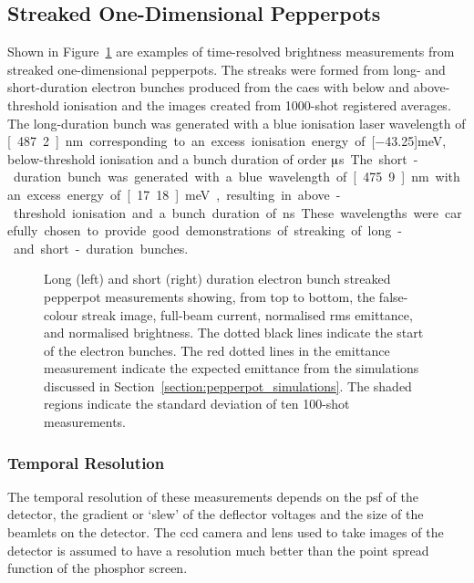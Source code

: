 \subsection{Streaked One-Dimensional Pepperpots}\label{section:streaked_pepperpot_results}
Shown in Figure~\ref{figure:streaks} are examples of time-resolved brightness measurements from streaked one-dimensional pepperpots.
The streaks were formed from long- and short-duration electron bunches produced from the \gls{caes} with below and above-threshold ionisation and the images created from 1000-shot registered averages.
The long-duration bunch was generated with a blue ionisation laser wavelength of \unit[487.2]{nm} corresponding to an excess ionisation energy of \unit[$-$43.25]{meV}, below-threshold ionisation and a bunch duration of order \unit[10]{$\muup$s}.
The short-duration bunch was generated with a blue wavelength of \unit[475.9]{nm} with an excess energy of \unit[17.18]{meV}, resulting in above-threshold ionisation and a bunch duration of \unit[5]{ns}.
These wavelengths were carefully chosen to provide good demonstrations of streaking of long- and short-duration bunches.

\begin{figure}
    \center
    
    \caption[Streaked brightness measurements for $\muup$ and ns timescales.]{Long (left) and short (right) duration electron bunch streaked pepperpot measurements showing, from top to bottom, the false-colour streak image, full-beam current, normalised \gls{rms} emittance, and normalised brightness. The dotted black lines indicate the start of the electron bunches. The red dotted lines in the emittance measurement indicate the expected emittance from the simulations discussed in Section~\ref{section:pepperpot_simulations}. The shaded regions indicate the standard deviation of ten 100-shot measurements.}
    \label{figure:streaks}
\end{figure}

\subsubsection{Temporal Resolution}
The temporal resolution of these measurements depends on the \gls{psf} of the detector, the gradient or `slew' of the deflector voltages and the size of the beamlets on the detector.
The \gls{ccd} camera and lens used to take images of the detector is assumed to have a resolution much better than the point spread function of the phosphor screen.

